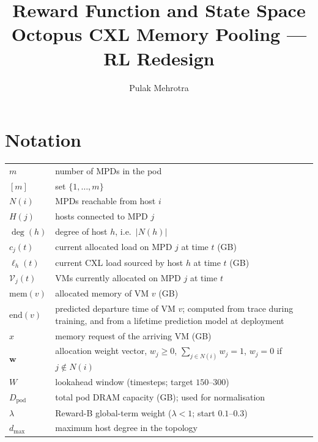 \documentclass[11pt]{article}
\title{Reward Function and State Space\\
\large Octopus CXL Memory Pooling --- RL Redesign}
\author{Pulak Mehrotra}
\date{}
\begin{document}
\maketitle

\section*{Notation}

\begin{tabular}{ll}
$m$                    & number of MPDs in the pod \\
$[m]$                  & set $\{1, \ldots, m\}$ \\
$N(i)$                 & MPDs reachable from host $i$ \\
$H(j)$                 & hosts connected to MPD $j$ \\
$\deg(h)$              & degree of host $h$, i.e.\ $|N(h)|$ \\
$c_j(t)$               & current allocated load on MPD $j$ at time $t$ (GB) \\
$\ell_h(t)$            & current CXL load sourced by host $h$ at time $t$ (GB) \\
$\mathcal{V}_j(t)$     & VMs currently allocated on MPD $j$ at time $t$ \\
$\mathrm{mem}(v)$      & allocated memory of VM $v$ (GB) \\
$\mathrm{end}(v)$      & predicted departure time of VM $v$;
                         computed from trace during training,
                         and from a lifetime prediction model
                         at deployment \cite{pond2023} \\
$x$                    & memory request of the arriving VM (GB) \\
$\mathbf{w}$           & allocation weight vector,
                         $w_j \geq 0$,
                         $\sum_{j \in N(i)} w_j = 1$,
                         $w_j = 0$ if $j \notin N(i)$ \\
$W$                    & lookahead window (timesteps; target $150$--$300$) \\
$D_\mathrm{pod}$       & total pod DRAM capacity (GB); used for normalisation \\
$\lambda$              & Reward-B global-term weight ($\lambda < 1$;
                         start $0.1$--$0.3$) \\
$d_\mathrm{max}$       & maximum host degree in the topology \\
\end{tabular}
\end{document}
